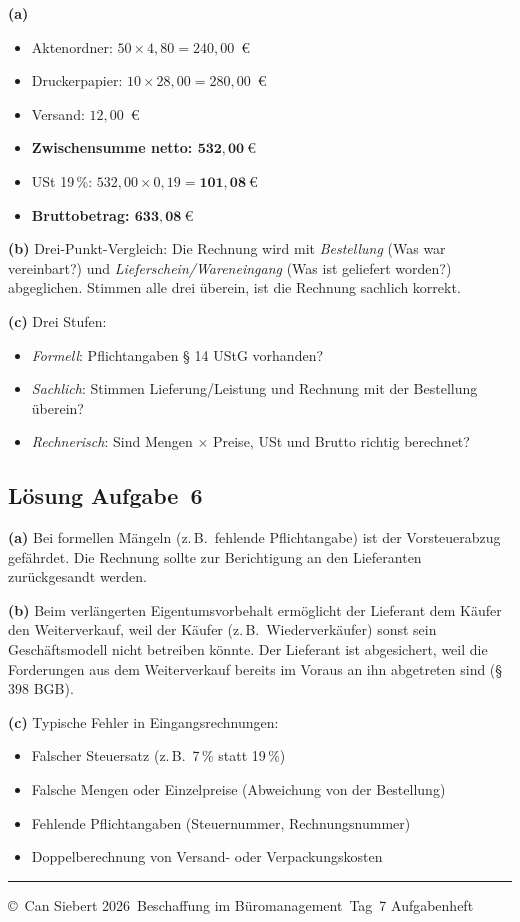 \documentclass[11pt, a4paper]{article}
\begin{document}
\begin{loesung}
\textbf{(a)}
\begin{itemize}[itemsep=0pt]
  \item Aktenordner: $50 \times 4{,}80 = 240{,}00$~€
  \item Druckerpapier: $10 \times 28{,}00 = 280{,}00$~€
  \item Versand: $12{,}00$~€
  \item \textbf{Zwischensumme netto: $\mathbf{532{,}00~€}$}
  \item USt 19\,\%: $532{,}00 \times 0{,}19 = \mathbf{101{,}08~€}$
  \item \textbf{Bruttobetrag: $\mathbf{633{,}08~€}$}
\end{itemize}

\textbf{(b)} Drei-Punkt-Vergleich: Die Rechnung wird mit \emph{Bestellung}
(Was war vereinbart?) und \emph{Lieferschein/Wareneingang} (Was ist geliefert worden?)
abgeglichen. Stimmen alle drei überein, ist die Rechnung sachlich korrekt.

\textbf{(c)} Drei Stufen:
\begin{itemize}[itemsep=0pt]
  \item \emph{Formell}: Pflichtangaben § 14 UStG vorhanden?
  \item \emph{Sachlich}: Stimmen Lieferung/Leistung und Rechnung mit der Bestellung überein?
  \item \emph{Rechnerisch}: Sind Mengen $\times$ Preise, USt und Brutto richtig berechnet?
\end{itemize}
\end{loesung}

\subsection*{Lösung Aufgabe~6}

\begin{loesung}
\textbf{(a)} Bei formellen Mängeln (z.\,B.\ fehlende Pflichtangabe) ist der
Vorsteuerabzug gefährdet. Die Rechnung sollte zur Berichtigung an den Lieferanten
zurückgesandt werden.

\textbf{(b)} Beim verlängerten Eigentumsvorbehalt ermöglicht der Lieferant dem
Käufer den Weiterverkauf, weil der Käufer (z.\,B.\ Wiederverkäufer) sonst sein
Geschäftsmodell nicht betreiben könnte. Der Lieferant ist abgesichert, weil die
Forderungen aus dem Weiterverkauf bereits im Voraus an ihn abgetreten sind
(§ 398 BGB).

\textbf{(c)} Typische Fehler in Eingangsrechnungen:
\begin{itemize}[itemsep=0pt]
  \item Falscher Steuersatz (z.\,B.\ 7\,\% statt 19\,\%)
  \item Falsche Mengen oder Einzelpreise (Abweichung von der Bestellung)
  \item Fehlende Pflichtangaben (Steuernummer, Rechnungsnummer)
  \item Doppelberechnung von Versand- oder Verpackungskosten
\end{itemize}
\end{loesung}

\vfill
\hrule
\vspace{0.5em}
\noindent\small\color{bfwInkSoft}\copyright\ Can Siebert\,\textperiodcentered\,2026\,\textperiodcentered{} Beschaffung im Büromanagement\,\textperiodcentered{} Tag~7 Aufgabenheft
\end{document}

